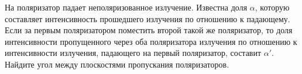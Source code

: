\documentclass[__main__.tex]{subfiles}
\begin{document}
На поляризатор падает неполяризованное излучение. Известна доля $\alpha$, которую составляет интенсивность прошедшего излучения по отношению к падающему. Если за первым поляризатором поместить второй такой же поляризатор, то доля интенсивности пропущенного через оба поляризатора излучения по отношению к интенсивности излучения, падающего на первый поляризатор, составит $\alpha'$. Найдите угол между плоскостями пропускания поляризаторов.\\ 

\end{document}
